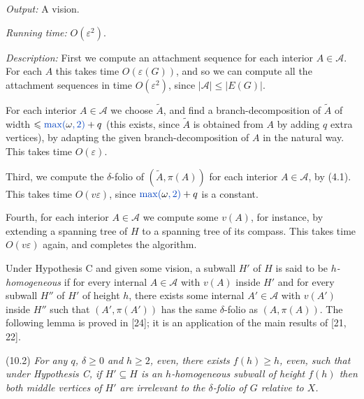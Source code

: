 \textit{Output:} A vision.

\textit{Running time:} $O(\varepsilon^2)$.

\textit{Description:} First we compute an attachment sequence for each interior $A \in \mathcal{A}$. For each $A$ this takes time $O(\varepsilon(G))$, and so we can compute all the attachment sequences in time $O(\varepsilon^2)$, since $|\mathcal{A}| \le |E(G)|$.

For each interior $A \in \mathcal{A}$ we choose $\tilde{A}$, and find a branch-decomposition of $\tilde{A}$ of width $\le \fix{\max(}\omega\fix{, 2)} + q$ (this exists, since $\tilde{A}$ is obtained from $A$ by adding $q$ extra vertices), by adapting the given branch-decomposition of $A$ in the natural way. This takes time $O(\varepsilon)$.

Third, we compute the $\delta$-folio of $(\tilde{A}, \pi(A))$ for each interior $A \in \mathcal{A}$, by (4.1). This takes time $O(v\varepsilon)$, since $\fix{\max(}\omega\fix{, 2)} + q$ is a constant.

Fourth, for each interior $A \in \mathcal{A}$ we compute some $v(A)$, for instance, by extending a spanning tree of $H$ to a spanning tree of its compass. This takes time $O(v\varepsilon)$ again, and completes the algorithm.

Under Hypothesis C and given some vision, a subwall $H'$ of $H$ is said to be \textit{$h$-homogeneous} if for every internal $A \in \mathcal{A}$ with $v(A)$ inside $H'$ and for every subwall $H''$ of $H'$ of height $h$, there exists some internal $A' \in \mathcal{A}$ with $v(A')$ inside $H''$ such that $(A', \pi(A'))$ has the same $\delta$-folio as $(A, \pi(A))$. The following lemma is proved in [24]; it is an application of the main results of [21, 22].

\stmt
(10.2) \textit{For any $q$, $\delta \ge 0$ and $h \ge 2$, even, there exists $f(h) \ge h$, even, such that under Hypothesis C, if $H' \subseteq H$ is an $h$-homogeneous subwall of height $f(h)$ then both middle vertices of $H'$ are irrelevant to the $\delta$-folio of $G$ relative to $X$.}

